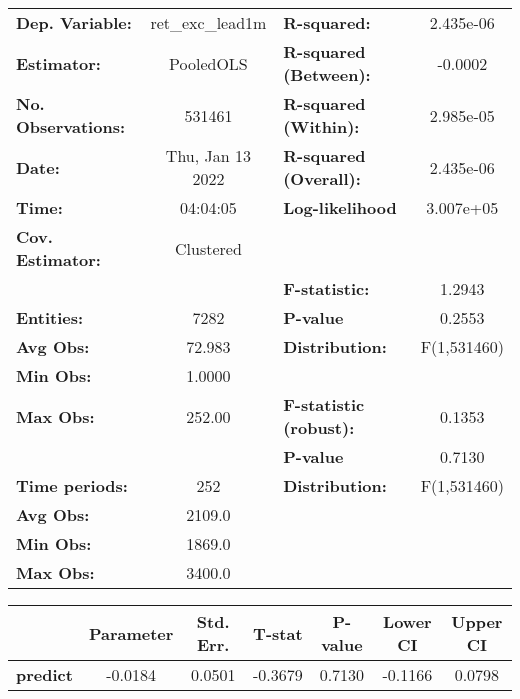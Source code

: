 \begin{center}
\begin{tabular}{lclc}
\toprule
\textbf{Dep. Variable:}    &  ret\_exc\_lead1m  & \textbf{  R-squared:         }   &    2.435e-06     \\
\textbf{Estimator:}        &     PooledOLS      & \textbf{  R-squared (Between):}  &     -0.0002      \\
\textbf{No. Observations:} &       531461       & \textbf{  R-squared (Within):}   &    2.985e-05     \\
\textbf{Date:}             &  Thu, Jan 13 2022  & \textbf{  R-squared (Overall):}  &    2.435e-06     \\
\textbf{Time:}             &      04:04:05      & \textbf{  Log-likelihood     }   &    3.007e+05     \\
\textbf{Cov. Estimator:}   &     Clustered      & \textbf{                     }   &                  \\
\textbf{}                  &                    & \textbf{  F-statistic:       }   &      1.2943      \\
\textbf{Entities:}         &        7282        & \textbf{  P-value            }   &      0.2553      \\
\textbf{Avg Obs:}          &       72.983       & \textbf{  Distribution:      }   &   F(1,531460)    \\
\textbf{Min Obs:}          &       1.0000       & \textbf{                     }   &                  \\
\textbf{Max Obs:}          &       252.00       & \textbf{  F-statistic (robust):} &      0.1353      \\
\textbf{}                  &                    & \textbf{  P-value            }   &      0.7130      \\
\textbf{Time periods:}     &        252         & \textbf{  Distribution:      }   &   F(1,531460)    \\
\textbf{Avg Obs:}          &       2109.0       & \textbf{                     }   &                  \\
\textbf{Min Obs:}          &       1869.0       & \textbf{                     }   &                  \\
\textbf{Max Obs:}          &       3400.0       & \textbf{                     }   &                  \\
\bottomrule
\end{tabular}
\begin{tabular}{lcccccc}
                 & \textbf{Parameter} & \textbf{Std. Err.} & \textbf{T-stat} & \textbf{P-value} & \textbf{Lower CI} & \textbf{Upper CI}  \\
\midrule
\textbf{predict} &      -0.0184       &       0.0501       &     -0.3679     &      0.7130      &      -0.1166      &       0.0798       \\
\bottomrule
\end{tabular}
\end{center}
